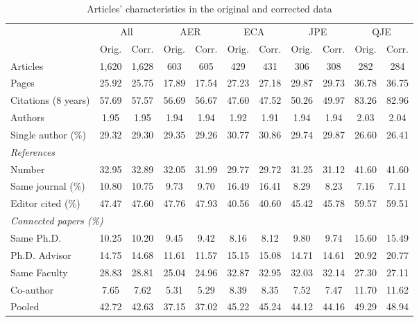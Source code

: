 \begin{table}[!htbp]
\renewcommand{\arraystretch}{1.25}
\centering
{}
\caption{Articles' characteristics in the original and corrected data}
\label{tab:descriptives}
\small
\setlength{\tabcolsep}{2pt}
\begin{tabular*}{\linewidth}{@{\extracolsep{\fill}}lcccccccccc}
\toprule
 & \multicolumn{2}{c}{All} & \multicolumn{2}{c}{AER} & \multicolumn{2}{c}{ECA} & \multicolumn{2}{c}{JPE} & \multicolumn{2}{c}{QJE} \\
\cmidrule(lr){2-3}\cmidrule(lr){4-5}\cmidrule(lr){6-7}\cmidrule(lr){8-9}\cmidrule(lr){10-11}
 & Orig. & Corr. & Orig. & Corr. & Orig. & Corr. & Orig. & Corr. & Orig. & Corr. \\
\midrule
Articles & 1,620 & 1,628 & 603 & 605 & 429 & 431 & 306 & 308 & 282 & 284 \\
Pages & 25.92 & 25.75 & 17.89 & 17.54 & 27.23 & 27.18 & 29.87 & 29.73 & 36.78 & 36.75 \\
Citations (8 years) & 57.69 & 57.57 & 56.69 & 56.67 & 47.60 & 47.52 & 50.26 & 49.97 & 83.26 & 82.96 \\
Authors & 1.95 & 1.95 & 1.94 & 1.94 & 1.92 & 1.91 & 1.94 & 1.94 & 2.03 & 2.04 \\
Single author (\%) & 29.32 & 29.30 & 29.35 & 29.26 & 30.77 & 30.86 & 29.74 & 29.87 & 26.60 & 26.41 \\
\multicolumn{11}{l}{\textit{References}} \\
\quad Number & 32.95 & 32.89 & 32.05 & 31.99 & 29.77 & 29.72 & 31.25 & 31.12 & 41.60 & 41.60 \\
\quad Same journal (\%) & 10.80 & 10.75 & 9.73 & 9.70 & 16.49 & 16.41 & 8.29 & 8.23 & 7.16 & 7.11 \\
\quad Editor cited (\%) & 47.47 & 47.60 & 47.76 & 47.93 & 40.56 & 40.60 & 45.42 & 45.78 & 59.57 & 59.51 \\
\multicolumn{11}{l}{\textit{Connected papers (\%)}} \\
\quad Same Ph.D. & 10.25 & 10.20 & 9.45 & 9.42 & 8.16 & 8.12 & 9.80 & 9.74 & 15.60 & 15.49 \\
\quad Ph.D. Advisor & 14.75 & 14.68 & 11.61 & 11.57 & 15.15 & 15.08 & 14.71 & 14.61 & 20.92 & 20.77 \\
\quad Same Faculty & 28.83 & 28.81 & 25.04 & 24.96 & 32.87 & 32.95 & 32.03 & 32.14 & 27.30 & 27.11 \\
\quad Co-author & 7.65 & 7.62 & 5.31 & 5.29 & 8.39 & 8.35 & 7.52 & 7.47 & 11.70 & 11.62 \\
\quad Pooled & 42.72 & 42.63 & 37.15 & 37.02 & 45.22 & 45.24 & 44.12 & 44.16 & 49.29 & 48.94 \\

\end{tabular*}
\end{table}

